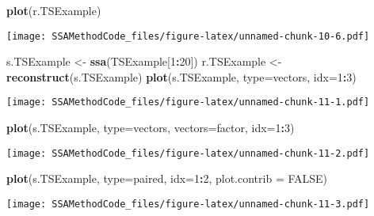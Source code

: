 \documentclass[
]{article}
\newenvironment{Shaded}{\begin{snugshade}}{\end{snugshade}}
\newcommand{\AttributeTok}[1]{\textcolor[rgb]{0.13,0.29,0.53}{#1}}
\newcommand{\ConstantTok}[1]{\textcolor[rgb]{0.56,0.35,0.01}{#1}}
\newcommand{\DecValTok}[1]{\textcolor[rgb]{0.00,0.00,0.81}{#1}}
\newcommand{\FunctionTok}[1]{\textcolor[rgb]{0.13,0.29,0.53}{\textbf{#1}}}
\newcommand{\NormalTok}[1]{#1}
\newcommand{\OtherTok}[1]{\textcolor[rgb]{0.56,0.35,0.01}{#1}}
\newcommand{\SpecialCharTok}[1]{\textcolor[rgb]{0.81,0.36,0.00}{\textbf{#1}}}
\newcommand{\StringTok}[1]{\textcolor[rgb]{0.31,0.60,0.02}{#1}}
\begin{document}
\begin{Shaded}
\begin{Highlighting}[]
\FunctionTok{plot}\NormalTok{(r.TSExample)}
\end{Highlighting}
\end{Shaded}

\texttt{[image: SSAMethodCode\_files/figure-latex/unnamed-chunk-10-6.pdf]}

\begin{Shaded}
\begin{Highlighting}[]
\NormalTok{s.TSExample }\OtherTok{\textless{}{-}} \FunctionTok{ssa}\NormalTok{(TSExample[}\DecValTok{1}\SpecialCharTok{:}\DecValTok{20}\NormalTok{])}
\NormalTok{r.TSExample }\OtherTok{\textless{}{-}} \FunctionTok{reconstruct}\NormalTok{(s.TSExample)}
\FunctionTok{plot}\NormalTok{(s.TSExample, }\AttributeTok{type=}\StringTok{\textquotesingle{}vectors\textquotesingle{}}\NormalTok{, }\AttributeTok{idx=}\DecValTok{1}\SpecialCharTok{:}\DecValTok{3}\NormalTok{)}
\end{Highlighting}
\end{Shaded}

\texttt{[image: SSAMethodCode\_files/figure-latex/unnamed-chunk-11-1.pdf]}

\begin{Shaded}
\begin{Highlighting}[]
\FunctionTok{plot}\NormalTok{(s.TSExample, }\AttributeTok{type=}\StringTok{\textquotesingle{}vectors\textquotesingle{}}\NormalTok{, }\AttributeTok{vectors=}\StringTok{\textquotesingle{}factor\textquotesingle{}}\NormalTok{, }\AttributeTok{idx=}\DecValTok{1}\SpecialCharTok{:}\DecValTok{3}\NormalTok{)}
\end{Highlighting}
\end{Shaded}

\texttt{[image: SSAMethodCode\_files/figure-latex/unnamed-chunk-11-2.pdf]}

\begin{Shaded}
\begin{Highlighting}[]
\FunctionTok{plot}\NormalTok{(s.TSExample, }\AttributeTok{type=}\StringTok{\textquotesingle{}paired\textquotesingle{}}\NormalTok{, }\AttributeTok{idx=}\DecValTok{1}\SpecialCharTok{:}\DecValTok{2}\NormalTok{, }\AttributeTok{plot.contrib =} \ConstantTok{FALSE}\NormalTok{)}
\end{Highlighting}
\end{Shaded}

\texttt{[image: SSAMethodCode\_files/figure-latex/unnamed-chunk-11-3.pdf]}
\end{document}

